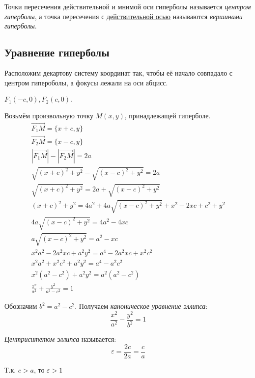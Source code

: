 Точки пересечения действительной и мнимой оси гиперболы называется \textit{центром гиперболы}, а точка пересечения с \underline{действительной осью} называются \textit{вершинами гиперболы}.

\subsection*{Уравнение гиперболы}

Расположим декартову систему координат так, чтобы её начало совпадало с центром гипероболы, а фокусы лежали на оси абцисс.

$F_1(-c, 0), F_2(c, 0)$.

Возьмём произвольную точку $M(x, y)$, принадлежащей гиперболе.
\begin{gather*}
  \overrightarrow{F_1M} = \{x + c, y\} \\
  \overrightarrow{F_2M} = \{x - c, y\} \\
  |\overrightarrow{F_1M}| - |\overrightarrow{F_2M}| = 2a \\
  \sqrt{(x + c)^2 + y^2} - \sqrt{(x - c)^2 + y^2} = 2a \\
  \sqrt{(x + c)^2 + y^2} = 2a + \sqrt{(x - c)^2 + y^2} \\
  (x + c)^2 + y^2 = 4a^2 + 4a\sqrt{(x - c)^2 + y^2} + x^2 - 2xc + c^2 + y^2 \\
  4a\sqrt{(x - c)^2 + y^2} = 4a^2 - 4xc \\
  a\sqrt{(x - c)^2 + y^2} = a^2 - xc \\
  x^2 a^2 - 2a^2xc + a^2y^2 = a^4 - 2a^2xc + x^2c^2 \\
  x^2a^2 + x^2c^2 + a^2y^2 = a^4 - a^2c^2 \\
  x^2(a^2 - c^2) + a^2y^2 = a^2(a^2 - c^2) \\
  \frac{x^2}{a^2} + \frac{y^2}{a^2 - c^2} = 1
\end{gather*}

Обозначим $b^2 = a^2 - c^2$. Получаем \textit{каноническое уравнение эллипса}: \[
  \boxed{\frac{x^2}{a^2} - \frac{y^2}{b^2} = 1}
\]  

\textit{Центриситетом эллипса} называется: \[
\varepsilon = \frac{2c}{2a} = \frac{c}{a}
\] 
\begin{note}
  Т.к. $c > a$, то  $\varepsilon > 1$
\end{note}

